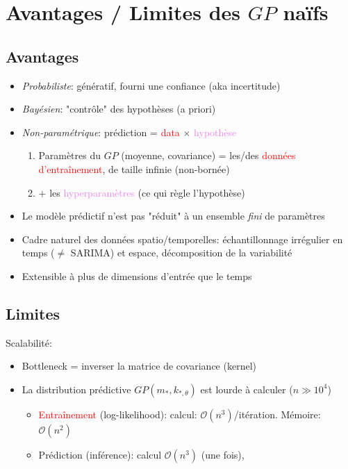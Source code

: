 \documentclass[xcolor=svgnames, t]{beamer}
\newcommand{\coloredemph}[1]{\textcolor{internationalblue}{\emph{#1}}}
\newcommand{\tored}[1]{\textcolor{red}{#1}}
\newcommand{\toblue}[1]{\textcolor{internationalblue}{#1}}
\newcommand{\topurple}[1]{\textcolor{violet}{#1}}
\begin{document}
\section{Avantages / Limites des $GP$ naïfs}

\subsection{Avantages}
\begin{frame}{\subsecname}
  \begin{itemize}
    \item \coloredemph{Probabiliste}: génératif, fourni une confiance (aka incertitude)
    \pause
    \item \coloredemph{Bayésien}: "contrôle" des hypothèses (a priori)
    \pause
    \item \coloredemph{Non-paramétrique}: \toblue{prédiction} = \tored{data} $\times$ \topurple{hypothèse}
      \begin{enumerate}
        \item Paramètres du $GP$ (moyenne, covariance) = les/des \tored{données d'entraînement}, de taille infinie (non-bornée)
        \pause
        \item $+$ les \topurple{hyperparamètres} (ce qui règle l'hypothèse)
      \end{enumerate}
    \pause
    \item Le modèle prédictif n'est pas "réduit" à un ensemble \coloredemph{fini} de paramètres
    \pause
    \item Cadre naturel des données spatio/temporelles: échantillonnage irrégulier en temps ($\neq$ SARIMA) et espace, décomposition de la variabilité
    \pause
    \item Extensible à plus de dimensions d'entrée que le temps
  \end{itemize}
\end{frame}

\subsection{Limites}
\begin{frame}{\subsecname}
  Scalabilité:
  \begin{itemize}
    \item Bottleneck = inverser la matrice de covariance (kernel)
    \item La distribution prédictive $GP( m_{*}, k_{*, \theta} )$ est lourde à calculer ($n \gg 10^4$)
      \begin{itemize}
        \item \tored{Entraînement} (log-likelihood): calcul: $\mathcal{O}(n^3)$/itération. Mémoire: $\mathcal{O}(n^2)$
        \item \toblue{Prédiction} (inférence): calcul $\mathcal{O}(n^3)$ (une fois), 
      \end{itemize}
  \end{itemize}
\end{frame}
\end{document}
